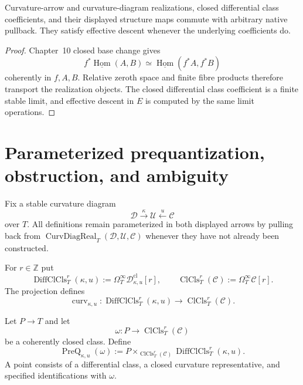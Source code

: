 \begin{proposition}
\label{prop:prequantum-curvature-diagram-pullback-descent}
Curvature-arrow and curvature-diagram realizations, closed differential class
coefficients, and their displayed structure maps commute with arbitrary native
pullback.  They satisfy effective descent whenever the underlying coefficients do.
\end{proposition}

\begin{proof}
Chapter~10 closed base change gives
\[
f^*\underline{\operatorname{Hom}}(A,B)
\simeq
\underline{\operatorname{Hom}}(f^*A,f^*B)
\]
coherently in $f,A,B$.  Relative zeroth space and finite fibre products therefore
transport the realization objects.  The closed differential class coefficient is
a finite stable limit, and effective descent in $E$ is computed by the same limit
operations.
\end{proof}

\section{Parameterized prequantization, obstruction, and ambiguity}
\label{sec:prequantum-parameterized-prequantization-realization}

Fix a stable curvature diagram
\[
\mathscr D\xrightarrow{\kappa}\mathscr U\xleftarrow{u}\mathscr C
\]
over $T$.  All definitions remain parameterized in both displayed arrows by pulling back
from $\operatorname{CurvDiagReal}_T(\mathscr D,\mathscr U,\mathscr C)$ whenever
they have not already been constructed.

\begin{definition}
\label{def:prequantum-differential-and-closed-class-moduli}
For $r\in\mathbb Z$ put
\[
\operatorname{DiffClCls}_T^r(\kappa,u)
:=
\Omega_T^\infty
\mathscr D^{\mathrm{cl}}_{\kappa,u}[r],
\qquad
\operatorname{ClCls}_T^r(\mathscr C)
:=
\Omega_T^\infty\mathscr C[r].
\]
The projection defines
\[
\operatorname{curv}_{\kappa,u}:
\operatorname{DiffClCls}_T^r(\kappa,u)
\longrightarrow
\operatorname{ClCls}_T^r(\mathscr C).
\]
\end{definition}

\begin{definition}
\label{def:prequantum-prequantization-of-closed-class}
Let $P\to T$ and let
\[
\omega:P\longrightarrow\operatorname{ClCls}_T^r(\mathscr C)
\]
be a coherently closed class.  Define
\[
\boxed{
\operatorname{PreQ}_{\kappa,u}(\omega)
:=
P\times_{\operatorname{ClCls}_T^r(\mathscr C)}
\operatorname{DiffClCls}_T^r(\kappa,u).
}
\]
A point consists of a differential class, a closed curvature representative, and
specified identifications with $\omega$.
\end{definition}

